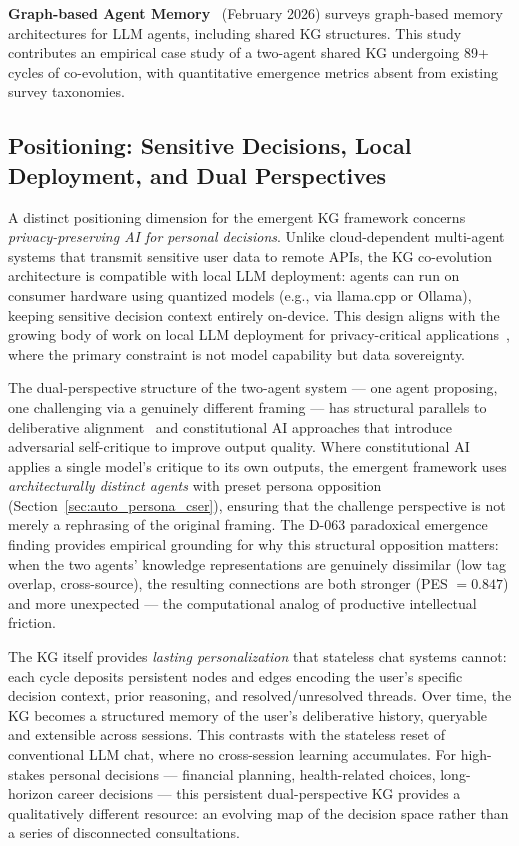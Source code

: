 \documentclass[12pt]{article}
\begin{document}
\textbf{Graph-based Agent Memory}~\cite{yang2026graphmemory} (February 2026) surveys
graph-based memory architectures for LLM agents, including shared KG structures.
This study contributes an empirical case study of a two-agent shared KG undergoing
89+ cycles of co-evolution, with quantitative emergence metrics absent from existing
survey taxonomies.

\subsection{Positioning: Sensitive Decisions, Local Deployment, and Dual Perspectives}
\label{sec:positioning}

A distinct positioning dimension for the emergent KG framework concerns
\emph{privacy-preserving AI for personal decisions}. Unlike cloud-dependent
multi-agent systems that transmit sensitive user data to remote APIs, the
KG co-evolution architecture is compatible with local LLM deployment: agents
can run on consumer hardware using quantized models (e.g., via llama.cpp or
Ollama), keeping sensitive decision context entirely on-device. This design
aligns with the growing body of work on local LLM deployment for privacy-critical
applications~\cite{chen2024internet}, where the primary constraint is not model
capability but data sovereignty.

The dual-perspective structure of the two-agent system --- one agent proposing,
one challenging via a genuinely different framing --- has structural parallels
to deliberative alignment~\cite{liang2024debate} and constitutional AI approaches
that introduce adversarial self-critique to improve output quality. Where
constitutional AI applies a single model's critique to its own outputs, the
emergent framework uses \emph{architecturally distinct agents} with preset
persona opposition (Section~\ref{sec:auto_persona_cser}), ensuring that the
challenge perspective is not merely a rephrasing of the original framing.
The D-063 paradoxical emergence finding provides empirical grounding for why
this structural opposition matters: when the two agents' knowledge representations
are genuinely dissimilar (low tag overlap, cross-source), the resulting connections
are both stronger (PES $= 0.847$) and more unexpected --- the computational
analog of productive intellectual friction.

The KG itself provides \emph{lasting personalization} that stateless chat systems
cannot: each cycle deposits persistent nodes and edges encoding the user's
specific decision context, prior reasoning, and resolved/unresolved threads.
Over time, the KG becomes a structured memory of the user's deliberative history,
queryable and extensible across sessions. This contrasts with the stateless
reset of conventional LLM chat, where no cross-session learning accumulates.
For high-stakes personal decisions --- financial planning, health-related choices,
long-horizon career decisions --- this persistent dual-perspective KG provides
a qualitatively different resource: an evolving map of the decision space rather
than a series of disconnected consultations.
\end{document}
